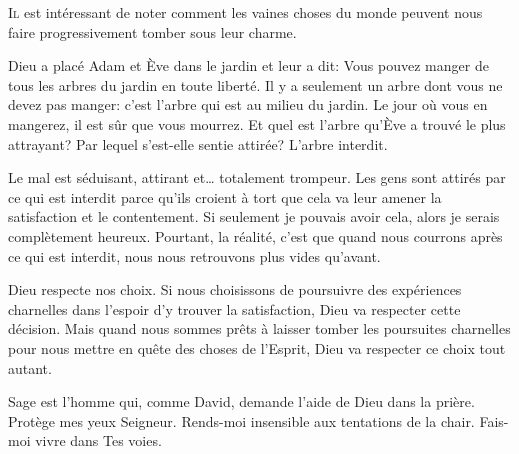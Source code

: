 





\lettrine{I}{l} est intéressant de noter comment les vaines choses
 du monde peuvent nous faire progressivement tomber sous leur charme.

Dieu a placé Adam et Ève dans le jardin et leur a dit:
 \Og Vous pouvez manger de tous les arbres du jardin en toute liberté.
 Il y a seulement un arbre dont vous ne devez pas manger: c'est l'arbre
 qui est au milieu du jardin. Le jour où vous en mangerez,
 il est sûr que vous mourrez. \Fg{}
 Et quel est l'arbre qu'Ève a trouvé le plus attrayant?
 Par lequel s'est-elle sentie attirée? L'arbre interdit.

Le mal est séduisant, attirant et\dots{} totalement trompeur.
 Les gens sont attirés par ce qui est interdit parce qu'ils croient
 à tort que cela va leur amener la satisfaction et le contentement.
 \Og Si seulement je pouvais avoir cela,
 alors je serais complètement heureux. \Fg{}
 Pourtant, la réalité, c'est que quand nous courrons après ce qui est interdit,
 nous nous retrouvons plus vides qu'avant.


Dieu respecte nos choix. Si nous choisissons de poursuivre des expériences
 charnelles dans l'espoir d'y trouver la satisfaction,
 Dieu va respecter cette décision.
 Mais quand nous sommes prêts à laisser tomber les poursuites charnelles
 pour nous mettre en quête des choses de l'Esprit,
 Dieu va respecter ce choix tout autant.

Sage est l'homme qui, comme David, demande l'aide de Dieu dans la prière.
 \Og Protège mes yeux Seigneur.
 Rends-moi insensible aux tentations de la chair.
 Fais-moi vivre dans Tes voies. \Fg{}

\dvrule



